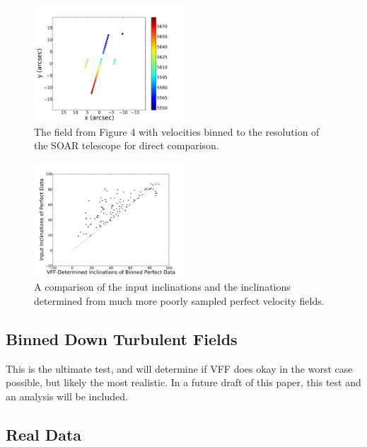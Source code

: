 \documentclass{emulateapj}
\begin{document}

\begin{figure}[h]
\includegraphics[width=0.5\textwidth]{binnedvels.pdf}
\caption{The field from Figure 4 with velocities binned to the resolution of the SOAR telescope for direct comparison. \label{fig:test}}
\end{figure}

\begin{figure}[h]
\includegraphics[width=0.5\textwidth]{binnedtest.pdf}
\caption{A comparison of the input inclinations and the inclinations determined from much more poorly sampled perfect velocity fields. \label{fig:test}}
\end{figure}

\subsection{Binned Down Turbulent Fields}
\large This is the ultimate test, and will determine if VFF does okay in the worst case possible, but likely the most realistic. In a future draft of this paper, this test and an analysis will be included.

\subsection{Real Data}
\end{document}
